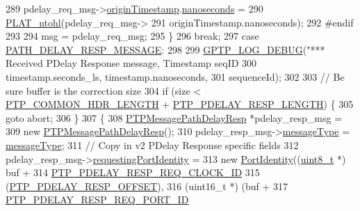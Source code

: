 \begin{DoxyCode}
{{{{{{289             pdelay\_req\_msg->\hyperlink{class_p_t_p_message_path_delay_req_a57a4bfcce938833de582c2ed5138aa3b}{originTimestamp}.\hyperlink{class_timestamp_a78ae11d98fcfe738239d0a853d82c84a}{nanoseconds} =
290                 \hyperlink{linux_2src_2platform_8cpp_ad335681c3444e0406899693a6f782173}{PLAT\_ntohl}(pdelay\_req\_msg->
291                        originTimestamp.nanoseconds);
292 \textcolor{preprocessor}{#endif}
293 
294             msg = pdelay\_req\_msg;
295         \}
296         \textcolor{keywordflow}{break};
297     \textcolor{keywordflow}{case} \hyperlink{avbts__message_8hpp_ac6606ebe91c8ac66a2c314c79f5ab013a34726fb5c993d42c4928bfb41941f22c}{PATH\_DELAY\_RESP\_MESSAGE}:
298 
299         \hyperlink{gptp__log_8hpp_ae4c6efe7c9cf6d7d3bbd28a0fd087d61}{GPTP\_LOG\_DEBUG}(\textcolor{stringliteral}{"*** Received PDelay Response message, Timestamp %
       seqID %
300                timestamp.seconds\_ls, timestamp.nanoseconds,
301                sequenceId);
302 
303         \textcolor{comment}{// Be sure buffer is the correction size}
304         \textcolor{keywordflow}{if} (size < \hyperlink{avbts__message_8hpp_a8ec4d965b7b1e83844f1c17f12e9b8e4}{PTP\_COMMON\_HDR\_LENGTH} + 
      \hyperlink{avbts__message_8hpp_ac0ec5cb983cc66ad538676830d3fb8a4}{PTP\_PDELAY\_RESP\_LENGTH}) \{
305             \textcolor{keywordflow}{goto} abort;
306         \}
307         \{
308             \hyperlink{class_p_t_p_message_path_delay_resp}{PTPMessagePathDelayResp} *pdelay\_resp\_msg =
309                 \textcolor{keyword}{new} \hyperlink{class_p_t_p_message_path_delay_resp}{PTPMessagePathDelayResp}();
310             pdelay\_resp\_msg->\hyperlink{class_p_t_p_message_common_adb32627aa5b0e2dbad3ccd88aab07c05}{messageType} = \hyperlink{class_p_t_p_message_common_adb32627aa5b0e2dbad3ccd88aab07c05}{messageType};
311             \textcolor{comment}{// Copy in v2 PDelay Response specific fields}
312             pdelay\_resp\_msg->\hyperlink{class_p_t_p_message_path_delay_resp_a27e69c7fb521ebffca13229a7c4658ce}{requestingPortIdentity} =
313                 \textcolor{keyword}{new} \hyperlink{class_port_identity}{PortIdentity}((\hyperlink{stdint_8h_aba7bc1797add20fe3efdf37ced1182c5}{uint8\_t} *) buf +
314                          \hyperlink{avbts__message_8hpp_a9c01e5eff56f505aca3f6f3deb6c34f1}{PTP\_PDELAY\_RESP\_REQ\_CLOCK\_ID}
315                          (\hyperlink{avbts__message_8hpp_a7c20f0e32d4408c124fa9e115ab32cf3}{PTP\_PDELAY\_RESP\_OFFSET}),
316                          (uint16\_t *) (buf +
317                                \hyperlink{avbts__message_8hpp_a1c5ac861894d1195aa57f60ef085798d}{PTP\_PDELAY\_RESP\_REQ\_PORT\_ID}
}}}}}}}
\end{DoxyCode}

